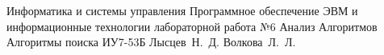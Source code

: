 \documentclass{bmstu}
\begin{document}
\makereporttitle
{Информатика и системы управления} %
{Программное обеспечение ЭВМ и информационные технологии}
{лабораторной работа №6} %
{Анализ Алгоритмов} %
{Алгоритмы поиска} %
{} %
{ИУ7-53Б} %
{Лысцев~Н.~Д.} %
{Волкова~Л.~Л.}

\maketableofcontents




%
%
%

\makebibliography
\end{document}
